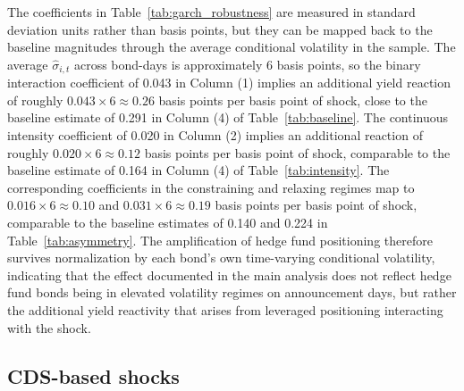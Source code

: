 \documentclass[english, 11pt, oneside]{article}
\begin{document}
The coefficients in Table~\ref{tab:garch_robustness} are measured in standard deviation units rather than basis points, but they can be mapped back to the baseline magnitudes through the average conditional volatility in the sample. The average $\hat{\sigma}_{i,t}$ across bond-days is approximately 6 basis points, so the binary interaction coefficient of 0.043 in Column (1) implies an additional yield reaction of roughly $0.043 \times 6 \approx 0.26$ basis points per basis point of shock, close to the baseline estimate of 0.291 in Column (4) of Table~\ref{tab:baseline}. The continuous intensity coefficient of 0.020 in Column (2) implies an additional reaction of roughly $0.020 \times 6 \approx 0.12$ basis points per basis point of shock, comparable to the baseline estimate of 0.164 in Column (4) of Table~\ref{tab:intensity}. The corresponding coefficients in the constraining and relaxing regimes map to $0.016 \times 6 \approx 0.10$ and $0.031 \times 6 \approx 0.19$ basis points per basis point of shock, comparable to the baseline estimates of 0.140 and 0.224 in Table~\ref{tab:asymmetry}. The amplification of hedge fund positioning therefore survives normalization by each bond's own time-varying conditional volatility, indicating that the effect documented in the main analysis does not reflect hedge fund bonds being in elevated volatility regimes on announcement days, but rather the additional yield reactivity that arises from leveraged positioning interacting with the shock.

\subsection{CDS-based shocks}
\label{subsec:cds_shocks}
\end{document}
